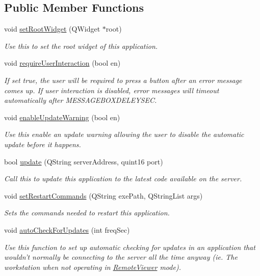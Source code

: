 \subsection*{Public Member Functions}
\begin{DoxyCompactItemize}
\item 
void \hyperlink{class_update_downloader_ad6e908ee6f2d0d4628eed54e25f54785}{set\-Root\-Widget} (Q\-Widget $\ast$root)
\begin{DoxyCompactList}\small\item\em Use this to set the root widget of this application. \end{DoxyCompactList}\item 
void \hyperlink{class_update_downloader_af8d0a5cbab8130f584e769d962fa2e66}{require\-User\-Interaction} (bool en)
\begin{DoxyCompactList}\small\item\em If set true, the user will be required to press a button after an error message comes up. If user interaction is disabled, error messages will timeout automatically after M\-E\-S\-S\-A\-G\-E\-B\-O\-X\-D\-E\-L\-E\-Y\-S\-E\-C. \end{DoxyCompactList}\item 
void \hyperlink{class_update_downloader_a29c0bc0761f8db9bf15b50872efe8180}{enable\-Update\-Warning} (bool en)
\begin{DoxyCompactList}\small\item\em Use this enable an update warning allowing the user to disable the automatic update before it happens. \end{DoxyCompactList}\item 
bool \hyperlink{class_update_downloader_ae085db8c029b141c6a21b85c6f10e46b}{update} (Q\-String server\-Address, quint16 port)
\begin{DoxyCompactList}\small\item\em Call this to update this application to the latest code available on the server. \end{DoxyCompactList}\item 
void \hyperlink{class_update_downloader_a01415b46808853162ac985874dbe252e}{set\-Restart\-Commands} (Q\-String exe\-Path, Q\-String\-List args)
\begin{DoxyCompactList}\small\item\em Sets the commands needed to restart this application. \end{DoxyCompactList}\item 
void \hyperlink{class_update_downloader_ace2c5d929e9802a3b72da92941058cd7}{auto\-Check\-For\-Updates} (int freq\-Sec)
\begin{DoxyCompactList}\small\item\em Use this function to set up automatic checking for updates in an application that wouldn't normally be connecting to the server all the time anyway (ie. The workstation when not operating in \hyperlink{class_remote_viewer}{Remote\-Viewer} mode). \end{DoxyCompactList}\end{DoxyCompactItemize}
